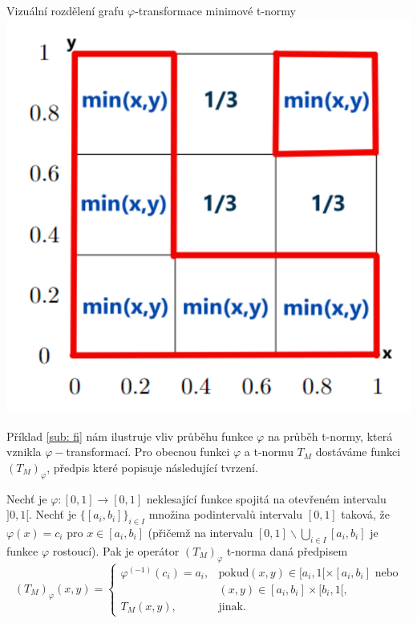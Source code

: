     
\begin{graph}Vizu\' aln\' i rozd\v elen\'i grafu $\varphi$-transformace minimov\' e t-normy\\
\tikzset{>=stealth}
\centering
\includegraphics[scale=0.8]{template-fig/phi-tnorm.pdf}
\end{graph}

    
Příklad \ref{sub: fi} nám ilustruje vliv průběhu funkce $\varphi$ na průběh t-normy, která vznikla $\varphi-$transformací. Pro obecnou funkci $\varphi$ a t-normu $T_M$ dostáváme funkci $(T_M)_{\varphi}$, předpis které popisuje následující tvrzení.
\begin{sentence}
\cite{mitav}
\label{t-norm}
 Nech\v t je $\varphi:[0,1]\rightarrow [0,1]$
neklesající funkce spojitá na otevřeném intervalu $]0,1[$.
Nech\v t je $\{[a_i,b_i]\}_{i\in I}$ množina podinterval\r u
intervalu $[0,1]$ taková, že $\varphi(x)=c_i$ pro $x\in
[a_i,b_i]$ (přičemž na intervalu $[0,1]\backslash \bigcup \limits_{i \in I}
[a_i,b_i]$ je funkce $\varphi$
rostoucí).
Pak je operátor $(T_M)_{\varphi}$  t-norma daná předpisem
$$ (T_M)_{\varphi}(x,y) = \begin{cases} \varphi^{(-1)}(c_i)=a_i, &\mbox {pokud
$(x,y)\in [a_i,1[\times[a_i,b_i]$ nebo}
\\ & (x,y)\in [a_i,b_i]\times[b_i,1[,
\\ T_M(x,y), &\mbox {jinak.}
\end{cases} $$
\end{sentence}

